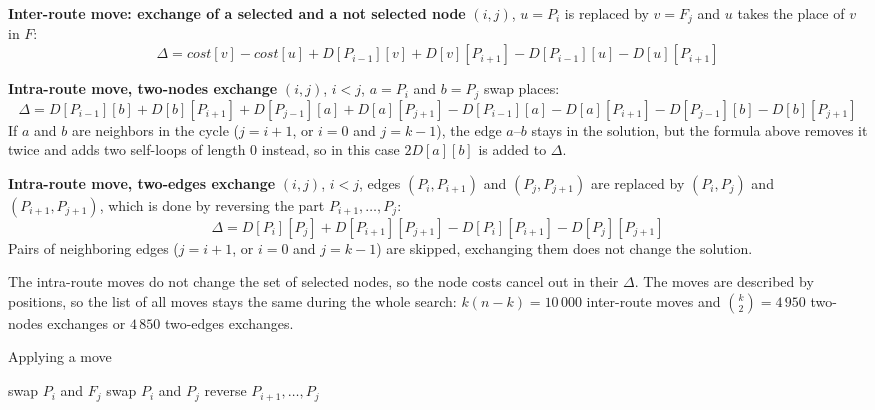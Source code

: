 \documentclass[11pt,a4paper]{article}
\begin{document}
\textbf{Inter-route move: exchange of a selected and a not selected node} $(i, j)$, $u = P_i$ is
replaced by $v = F_j$ and $u$ takes the place of $v$ in $F$:
\[
  \Delta = \mathit{cost}[v] - \mathit{cost}[u] + D[P_{i-1}][v] + D[v][P_{i+1}] - D[P_{i-1}][u] - D[u][P_{i+1}]
\]

\textbf{Intra-route move, two-nodes exchange} $(i, j)$, $i < j$, $a = P_i$ and $b = P_j$ swap places:
\[
  \Delta = D[P_{i-1}][b] + D[b][P_{i+1}] + D[P_{j-1}][a] + D[a][P_{j+1}]
         - D[P_{i-1}][a] - D[a][P_{i+1}] - D[P_{j-1}][b] - D[b][P_{j+1}]
\]
If $a$ and $b$ are neighbors in the cycle ($j = i + 1$, or $i = 0$ and $j = k - 1$), the edge
$a$--$b$ stays in the solution, but the formula above removes it twice and adds two self-loops of
length 0 instead, so in this case $2 D[a][b]$ is added to $\Delta$.

\textbf{Intra-route move, two-edges exchange} $(i, j)$, $i < j$, edges $(P_i, P_{i+1})$ and
$(P_j, P_{j+1})$ are replaced by $(P_i, P_j)$ and $(P_{i+1}, P_{j+1})$, which is done by reversing
the part $P_{i+1}, \dots, P_j$:
\[
  \Delta = D[P_i][P_j] + D[P_{i+1}][P_{j+1}] - D[P_i][P_{i+1}] - D[P_j][P_{j+1}]
\]
Pairs of neighboring edges ($j = i + 1$, or $i = 0$ and $j = k - 1$) are skipped, exchanging them
does not change the solution.

The intra-route moves do not change the set of selected nodes, so the node costs cancel out in their
$\Delta$. The moves are described by positions, so the list of all moves stays the same during the
whole search: $k (n - k) = 10\,000$ inter-route moves and $\binom{k}{2} = 4\,950$ two-nodes exchanges
or $4\,850$ two-edges exchanges.

\begin{algorithm}[H]
\caption{Applying a move}
\begin{algorithmic}[1]
    \State swap $P_i$ and $F_j$
    \State swap $P_i$ and $P_j$
  \Else
    \State reverse $P_{i+1}, \dots, P_j$
  \EndIf
\EndFunction
\end{algorithmic}
\end{algorithm}
\end{document}
